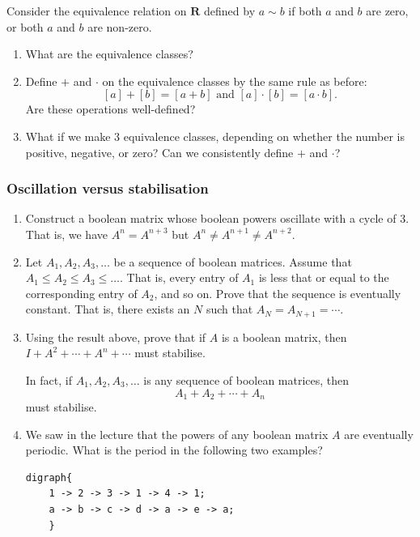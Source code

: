 \documentclass{amsart}
\begin{document}
Consider the equivalence relation on \(\mathbf{R}\) defined by \(a \sim b\) if both \(a\) and \(b\) are zero, or both \(a\) and \(b\) are non-zero.

\begin{enumerate}
\item What are the equivalence classes?

\item Define \(+\) and \(\cdot\) on the equivalence classes by the same rule as before:
\[ [a] + [b] = [a+b] \text{ and } [a] \cdot [b] = [a \cdot b].\]
Are these operations well-defined?

\item What if we make 3 equivalence classes, depending on whether the number is positive, negative, or zero?  Can we consistently define \(+\) and \(\cdot\)?
\end{enumerate}
\subsubsection{Oscillation versus stabilisation}
\label{sec:orgcd947ac}

\begin{enumerate}
\item Construct a boolean matrix whose boolean powers oscillate with a cycle of 3.
That is, we have \(A^{n} = A^{n+3}\) but \(A^n \neq A^{n+1} \neq A^{n+2}\).

\item Let \(A_1, A_2, A_3, \dots\) be a sequence of boolean matrices.
Assume that \(A_1 \leq A_2 \leq A_3 \leq \dots\).
That is, every entry of \(A_1\) is less that or equal to the corresponding entry of \(A_2\), and so on.
Prove that the sequence is eventually constant.
That is, there exists an \(N\) such that \(A_N = A_{N+1} = \cdots\).

\item Using the result above, prove that if \(A\) is a boolean matrix, then \(I+A^2+\cdots+A^n + \cdots\) must stabilise.

In fact, if \(A_1,A_2,A_3, \dots\) is any sequence of boolean matrices, then
\[ A_1 + A_2 + \cdots + A_n\]
must stabilise.

\item We saw in the lecture that the powers of any boolean matrix \(A\) are eventually periodic.
What is the period in the following two examples?
\begin{verbatim}
digraph{
	1 -> 2 -> 3 -> 1 -> 4 -> 1;
	a -> b -> c -> d -> a -> e -> a;
	}	
\end{verbatim}
\begin{center}

\label{org282634f}
\end{center}
\end{enumerate}
\end{document}

